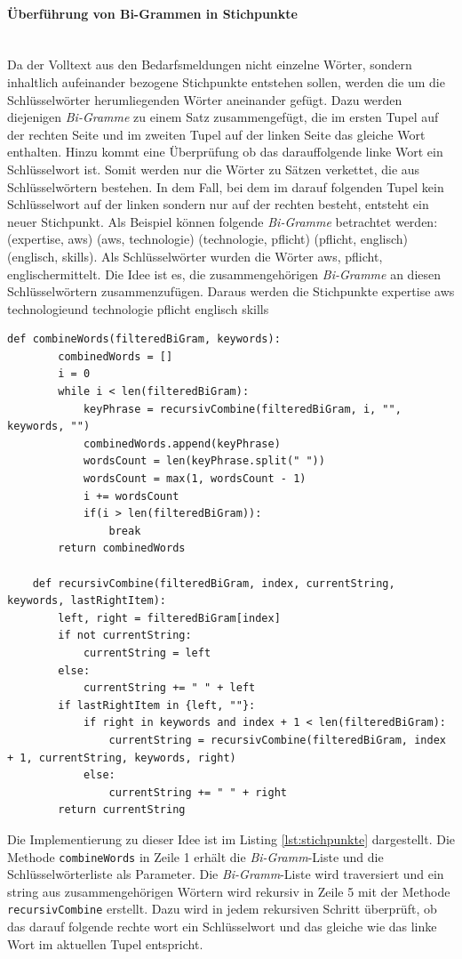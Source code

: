 \paragraph{Überführung von Bi-Grammen in Stichpunkte}\mbox{}\\
Da der Volltext aus den Bedarfsmeldungen nicht einzelne Wörter, sondern inhaltlich aufeinander bezogene Stichpunkte entstehen sollen, werden die um die Schlüsselwörter herumliegenden Wörter aneinander gefügt. Dazu werden diejenigen \emph{Bi-Gramme} zu einem Satz zusammengefügt, die im ersten Tupel auf der rechten Seite und im zweiten Tupel auf der linken Seite das gleiche Wort enthalten. Hinzu kommt eine Überprüfung ob das darauffolgende linke Wort ein Schlüsselwort ist. Somit werden nur die Wörter zu Sätzen verkettet, die aus Schlüsselwörtern bestehen. In dem Fall, bei dem im darauf folgenden Tupel kein Schlüsselwort auf der linken sondern nur auf der rechten besteht, entsteht ein neuer Stichpunkt. Als Beispiel können folgende \emph{Bi-Gramme} betrachtet werden: (\grqq expertise\grqq, \grqq aws\grqq) (\grqq aws\grqq, \grqq technologie\grqq) (\grqq technologie\grqq, \grqq pflicht\grqq) (\grqq pflicht\grqq, \grqq englisch\grqq) (\grqq englisch\grqq, \grqq skills\grqq). Als Schlüsselwörter wurden die Wörter \grqq aws\grqq, \grqq pflicht\grqq, \grqq englisch\grqq ermittelt. Die Idee ist es, die zusammengehörigen \emph{Bi-Gramme} an diesen Schlüsselwörtern zusammenzufügen. Daraus werden die Stichpunkte \grqq expertise aws technologie\grqq und \grqq technologie pflicht englisch skills\grqq
\begin{lstlisting}[caption={Umformung der Bi-Gramm Liste in Stichpunkte}, label=lst:stichpunkte]
	def combineWords(filteredBiGram, keywords):
		combinedWords = []
		i = 0
		while i < len(filteredBiGram):
			keyPhrase = recursivCombine(filteredBiGram, i, "", keywords, "")
			combinedWords.append(keyPhrase)
			wordsCount = len(keyPhrase.split(" "))
			wordsCount = max(1, wordsCount - 1)
			i += wordsCount
			if(i > len(filteredBiGram)):
				break
		return combinedWords
	
	def recursivCombine(filteredBiGram, index, currentString, keywords, lastRightItem):
		left, right = filteredBiGram[index]
		if not currentString:
			currentString = left
		else:
			currentString += " " + left
		if lastRightItem in {left, ""}:
			if right in keywords and index + 1 < len(filteredBiGram):
				currentString = recursivCombine(filteredBiGram, index + 1, currentString, keywords, right)
			else:
				currentString += " " + right
		return currentString
\end{lstlisting}
Die Implementierung zu dieser Idee ist im Listing \ref{lst:stichpunkte} dargestellt. Die Methode \lstinline{combineWords} in Zeile 1 erhält die \emph{Bi-Gramm}-Liste und die Schlüsselwörterliste als Parameter. Die \emph{Bi-Gramm}-Liste wird traversiert und ein string aus zusammengehörigen Wörtern wird rekursiv in Zeile 5 mit der Methode \lstinline{recursivCombine} erstellt. Dazu wird in jedem rekursiven Schritt überprüft, ob das darauf folgende rechte wort ein Schlüsselwort und das gleiche wie das linke Wort im aktuellen Tupel entspricht. 

